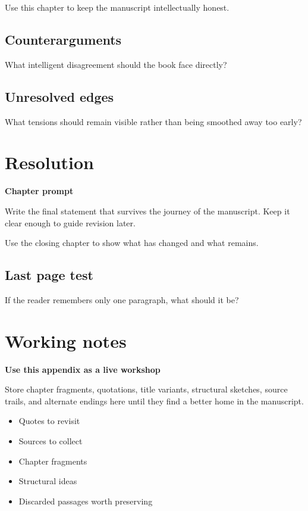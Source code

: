 \documentclass[11pt,openany]{book}
\newcommand{\chapterprompt}[1]{
\begin{chapterbox}
\textbf{Chapter prompt}\par
#1
\end{chapterbox}
}
\begin{document}
Use this chapter to keep the manuscript intellectually honest.

\section{Counterarguments}

What intelligent disagreement should the book face directly?

\section{Unresolved edges}

What tensions should remain visible rather than being smoothed away too early?

\chapter{Resolution}
\chapterprompt{Write the final statement that survives the journey of the manuscript. Keep it clear enough to guide revision later.}

Use the closing chapter to show what has changed and what remains.

\section{Last page test}

If the reader remembers only one paragraph, what should it be?

\appendix

\chapter{Working notes}

\begin{notebox}
\textbf{Use this appendix as a live workshop}\par
Store chapter fragments, quotations, title variants, structural sketches, source trails, and alternate endings here until they find a better home in the manuscript.
\end{notebox}

\begin{itemize}
  \item Quotes to revisit
  \item Sources to collect
  \item Chapter fragments
  \item Structural ideas
  \item Discarded passages worth preserving
\end{itemize}
\end{document}
